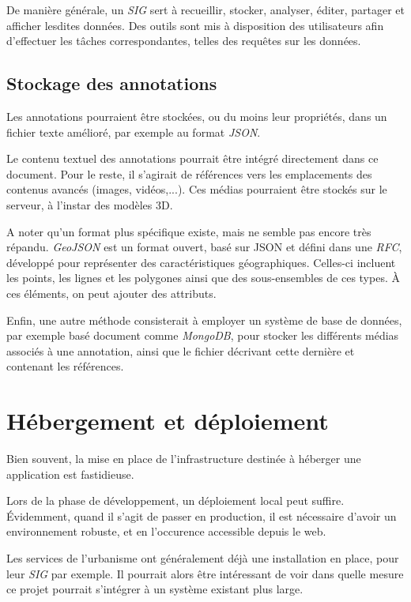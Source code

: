 De manière générale, un \textit{SIG} sert à recueillir, stocker, analyser, éditer, partager et afficher lesdites données. Des outils sont mis à disposition des utilisateurs afin d'effectuer les tâches correspondantes, telles des requêtes sur les données.

\subsection{Stockage des annotations}
Les annotations pourraient être stockées, ou du moins leur propriétés, dans un fichier texte amélioré, par exemple au format \textit{JSON}.

Le contenu textuel des annotations pourrait être intégré directement dans ce document. Pour le reste, il s'agirait de références vers les emplacements des contenus avancés (images, vidéos,...). Ces médias pourraient être stockés sur le serveur, à l'instar des modèles 3D.

A noter qu'un format plus spécifique existe, mais ne semble pas encore très répandu.
\textit{GeoJSON} est un format ouvert,  basé sur JSON et défini dans une \textit{RFC}\cite{geojson-rfc}, développé pour représenter des caractéristiques géographiques. 
Celles-ci incluent les points, les lignes et les polygones ainsi que des sous-ensembles de ces types. À ces éléments, on peut ajouter des attributs.

Enfin, une autre méthode consisterait à employer un système de base de données, par exemple basé document comme \textit{MongoDB}, pour stocker les différents médias associés à une annotation, ainsi que le fichier décrivant cette dernière et contenant les références.

\section{Hébergement et déploiement}

Bien souvent, la mise en place de l'infrastructure destinée à héberger une application est fastidieuse.

Lors de la phase de développement, un déploiement local peut suffire. Évidemment, quand il s'agit de passer en production, il est nécessaire d'avoir un environnement robuste, et en l'occurence accessible depuis le web.

Les services de l'urbanisme ont généralement déjà une installation en place, pour leur \textit{SIG} par exemple. Il pourrait alors être intéressant de voir dans quelle mesure ce projet pourrait s'intégrer à un système existant plus large.

